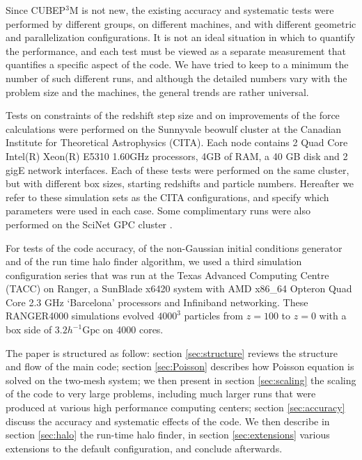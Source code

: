 \documentclass[useAMS,usenatbib]{mn2e}
\begin{document}

Since {\small CUBEP$^3$M} is not new, the existing  accuracy and systematic tests were performed by different groups, on different machines,
and with different geometric and parallelization configurations. It is not an ideal situation in which to quantify the performance, and each test must be viewed as a
separate measurement that quantifies a specific aspect of the code. 
We have tried to keep to a minimum the number of such different runs, and although the detailed numbers vary 
with the problem size and the machines, the general trends are rather universal.

Tests on constraints of the redshift step size and on improvements of the force calculations were performed 
on the Sunnyvale beowulf cluster at the Canadian Institute for Theoretical Astrophysics (CITA).
Each node contains 2 Quad Core Intel(R) Xeon(R) E5310 1.60GHz processors, 4GB of RAM,  a 40 GB disk and 2 gigE network interfaces. 
Each of these tests were performed on the same cluster, but with  different box sizes, starting redshifts and particle numbers.
Hereafter we refer to these simulation sets as the CITA configurations, and specify which parameters were used in each case.
Some complimentary runs were also performed on the SciNet GPC cluster \citep{Scinet}.

For tests of the code accuracy, of the non-Gaussian initial conditions generator and of the run time halo finder algorithm, 
we used a third simulation configuration series that was run at the Texas Advanced Computing Centre (TACC) on Ranger, a SunBlade 
x6420 system with AMD x86\_64 Opteron Quad Core 2.3 GHz `Barcelona' processors and Infiniband networking.
These RANGER4000 simulations evolved $4000^{3}$ particles 
from $z=100$ to $z=0$ with a box side of $3.2 h^{-1}\mbox{Gpc}$
on 4000 cores.
 

The paper is structured as follow: section \ref{sec:structure} reviews the structure and flow of the main code;
section \ref{sec:Poisson} describes how Poisson equation is solved on the two-mesh system;
we then present in section \ref{sec:scaling} the scaling of the code to very large problems,
including much larger runs that were produced at various high performance computing centers;
section \ref{sec:accuracy}  discuss the accuracy and systematic effects of the code.
 We then describe in section \ref{sec:halo} the run-time halo finder, in section \ref{sec:extensions} various extensions
 to the default configuration, and conclude afterwards.
\end{document}
